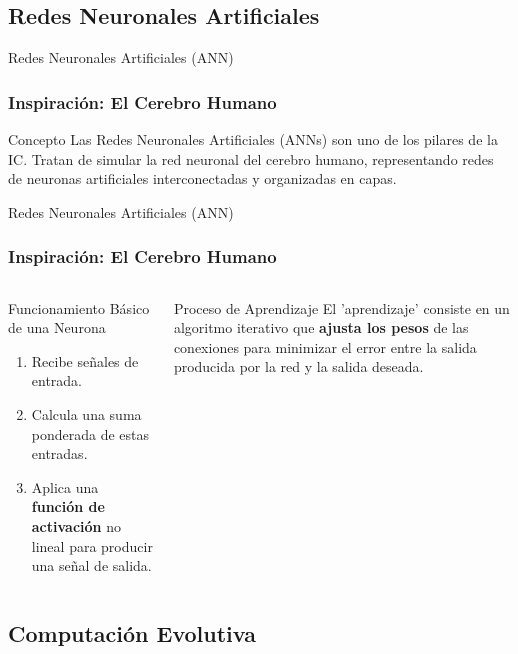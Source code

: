 \documentclass[aspectratio=169,xcolor=dvipsnames]{beamer}
\begin{document}
\subsection{Redes Neuronales Artificiales}

\begin{frame}{Redes Neuronales Artificiales (ANN)}
    \frametitle{Inspiración: El Cerebro Humano}
    \begin{block}{Concepto}
    Las Redes Neuronales Artificiales (ANNs) son uno de los pilares de la IC. Tratan de simular la red neuronal del cerebro humano, representando redes de neuronas artificiales interconectadas y organizadas en capas.
    \end{block}
\end{frame}

\begin{frame}{Redes Neuronales Artificiales (ANN)}
    \frametitle{Inspiración: El Cerebro Humano}
    \begin{columns}[c]
            \begin{alertblock}{Funcionamiento Básico de una Neurona}
                 \begin{enumerate}
                    \item Recibe señales de entrada.
                    \item Calcula una suma ponderada de estas entradas.
                    \item Aplica una \textbf{función de activación} no lineal para producir una señal de salida.
                \end{enumerate}
            \end{alertblock}
             \begin{block}{Proceso de Aprendizaje}
                El 'aprendizaje' consiste en un algoritmo iterativo que \textbf{ajusta los pesos} de las conexiones para minimizar el error entre la salida producida por la red y la salida deseada.
            \end{block}
    \end{columns}
\end{frame}

\subsection{Computación Evolutiva}
\end{document}

